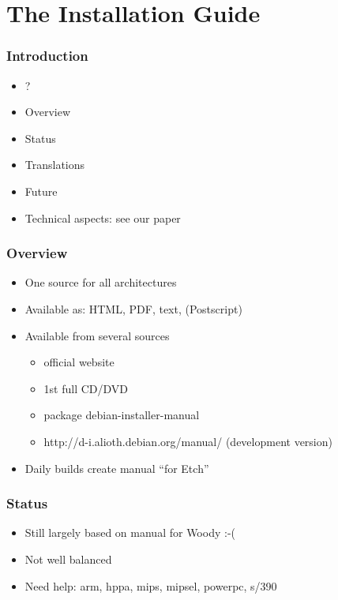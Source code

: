 \documentclass{beamer}
\begin{document}

\section{The Installation Guide}

\begin{frame}
  \frametitle{Introduction}
	\begin{itemize}
	\item
		?
	\item
		Overview
	\item
		Status
	\item
		Translations
	\item
		Future
	\item
		Technical aspects: see our paper
	\end{itemize}
\end{frame}

\begin{frame}
  \frametitle{Overview}
	\begin{itemize}
	\item
		One source for all architectures
	\item
		Available as: HTML, PDF, text, (Postscript)
	\item
		Available from several sources
		\begin{itemize}
		\item
			official website
		\item
			1st full CD/DVD
		\item
			package debian-installer-manual
		\item
			http://d-i.alioth.debian.org/manual/ (development version)
		\end{itemize}
	\item
		Daily builds create manual ``for Etch''
	\end{itemize}
\end{frame}

\begin{frame}
  \frametitle{Status}
	\begin{itemize}
	\item
		Still largely based on manual for Woody :-(
	\item
		Not well balanced
	\item
		Need help: arm, hppa, mips, mipsel, powerpc, s/390
	\end{itemize}
\end{frame}
\end{document}
